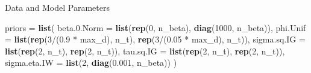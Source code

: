 \documentclass[11pt,ignorenonframetext,]{beamer}
\newenvironment{Shaded}{}{}
\newcommand{\KeywordTok}[1]{\textcolor[rgb]{0.00,0.44,0.13}{\textbf{#1}}}
\newcommand{\DataTypeTok}[1]{\textcolor[rgb]{0.56,0.13,0.00}{#1}}
\newcommand{\DecValTok}[1]{\textcolor[rgb]{0.25,0.63,0.44}{#1}}
\newcommand{\FloatTok}[1]{\textcolor[rgb]{0.25,0.63,0.44}{#1}}
\newcommand{\StringTok}[1]{\textcolor[rgb]{0.25,0.44,0.63}{#1}}
\newcommand{\OperatorTok}[1]{\textcolor[rgb]{0.40,0.40,0.40}{#1}}
\newcommand{\NormalTok}[1]{#1}
\let\oldShaded\Shaded
\let\endoldShaded\endShaded
\renewenvironment{Shaded}{\footnotesize\begin{spacing}{0.9}\oldShaded}{\endoldShaded\end{spacing}}
\begin{document}
\begin{frame}[fragile]{Data and Model Parameters}
\begin{Shaded}
\begin{Highlighting}[]
\NormalTok{priors =}\StringTok{ }\KeywordTok{list}\NormalTok{(}
  \DataTypeTok{beta.0.Norm =} \KeywordTok{list}\NormalTok{(}\KeywordTok{rep}\NormalTok{(}\DecValTok{0}\NormalTok{, n_beta), }\KeywordTok{diag}\NormalTok{(}\DecValTok{1000}\NormalTok{, n_beta)), }
  \DataTypeTok{phi.Unif =} \KeywordTok{list}\NormalTok{(}\KeywordTok{rep}\NormalTok{(}\DecValTok{3}\OperatorTok{/}\NormalTok{(}\FloatTok{0.9} \OperatorTok{*}\StringTok{ }\NormalTok{max_d), n_t), }\KeywordTok{rep}\NormalTok{(}\DecValTok{3}\OperatorTok{/}\NormalTok{(}\FloatTok{0.05} \OperatorTok{*}\StringTok{ }\NormalTok{max_d), n_t)), }
  \DataTypeTok{sigma.sq.IG =} \KeywordTok{list}\NormalTok{(}\KeywordTok{rep}\NormalTok{(}\DecValTok{2}\NormalTok{, n_t), }\KeywordTok{rep}\NormalTok{(}\DecValTok{2}\NormalTok{, n_t)), }
  \DataTypeTok{tau.sq.IG =} \KeywordTok{list}\NormalTok{(}\KeywordTok{rep}\NormalTok{(}\DecValTok{2}\NormalTok{, n_t), }\KeywordTok{rep}\NormalTok{(}\DecValTok{2}\NormalTok{, n_t)),}
  \DataTypeTok{sigma.eta.IW =} \KeywordTok{list}\NormalTok{(}\DecValTok{2}\NormalTok{, }\KeywordTok{diag}\NormalTok{(}\FloatTok{0.001}\NormalTok{, n_beta))}
\NormalTok{)}
\end{Highlighting}
\end{Shaded}

\end{frame}
\end{document}
